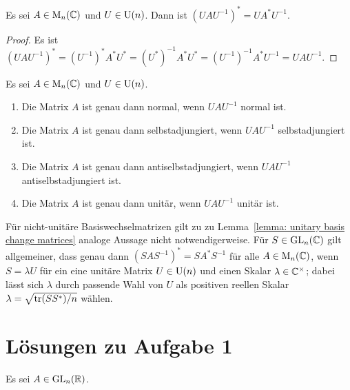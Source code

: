 \documentclass[a4paper, 10pt, numbers=noenddot]{scrartcl}
\begin{document}
\begin{lemma}\label{lemma: unitary basis change matrices}
  Es sei $A \in \operatorname{M}_n(\mathbb{C})$ und $U \in \operatorname{U}(n)$.
  Dann ist $(U \! A U^{-1})^* = U \! A^* U^{-1}$.
\end{lemma}
\begin{proof}
  Es ist
  $
      (U \! A U^{-1})^*
    = (U^{-1})^* A^* U^*
    = (U^*)^{-1} A^* U^*
    = (U^{-1})^{-1} A^* U^{-1}
    = U \! A U^{-1}.
  $
\end{proof}


\begin{corollary}
  Es sei $A \in \operatorname{M}_n(\mathbb{C})$ und $U \in \operatorname{U}(n)$.
  \begin{enumerate}[leftmargin=*]
    \item
      Die Matrix $A$ ist genau dann normal, wenn $U \! A U^{-1}$ normal ist.
    \item
      Die Matrix $A$ ist genau dann selbstadjungiert, wenn $U \! A U^{-1}$ selbstadjungiert ist.
    \item
      Die Matrix $A$ ist genau dann antiselbstadjungiert, wenn $U \! A U^{-1}$ antiselbstadjungiert ist.
    \item
      Die Matrix $A$ ist genau dann unitär, wenn $U \! A U^{-1}$ unitär ist.
  \end{enumerate}
\end{corollary}


\begin{remark}
  Für nicht-unitäre Basiswechselmatrizen gilt zu zu Lemma~\ref{lemma: unitary basis change matrices} analoge Aussage nicht notwendigerweise.
  Für $S \in \operatorname{GL}_n(\mathbb{C})$ gilt allgemeiner, dass genau dann $(S A S^{-1})^* = S A^* S^{-1}$ für alle $A \in \operatorname{M}_n(\mathbb{C})$, wenn $S = \lambda U$ für ein eine unitäre Matrix $U \in \operatorname{U}(n)$ und einen Skalar $\lambda \in \mathbb{C}^\times$; dabei lässt sich $\lambda$ durch passende Wahl von $U$ als positiven reellen Skalar $\lambda = \sqrt{\operatorname{tr}(SS^*)/n}$ wählen.
\end{remark}










\section{Lösungen zu Aufgabe 1}


Es sei $A \in \operatorname{GL}_n(\mathbb{R})$.
\end{document}

